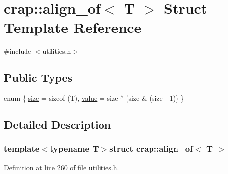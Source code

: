 \hypertarget{structcrap_1_1align__of}{\section{crap\+:\+:align\+\_\+of$<$ T $>$ Struct Template Reference}
\label{structcrap_1_1align__of}
}


{\ttfamily \#include $<$utilities.\+h$>$}

\subsection*{Public Types}
\begin{DoxyCompactItemize}
\item 
enum \{ \hyperlink{structcrap_1_1align__of_abb8a0e6a99bb6e29dffcf0148ba95521a8b5c1072cbffe59ec024940bd1bcbe2b}{size} = sizeof (T), 
\hyperlink{structcrap_1_1align__of_abb8a0e6a99bb6e29dffcf0148ba95521a681bb33919188c1863cff58c23b72e69}{value} = size $^\wedge$ (size \& (size -\/ 1))
 \}
\end{DoxyCompactItemize}


\subsection{Detailed Description}
\subsubsection*{template$<$typename T$>$struct crap\+::align\+\_\+of$<$ T $>$}



Definition at line 260 of file utilities.\+h.



